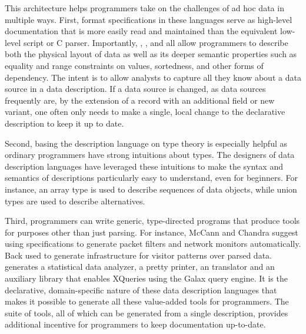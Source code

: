 This architecture helps programmers take on the challenges of ad hoc
data in multiple ways.  First, format specifications in these
languages serve as high-level documentation that is more easily read
and maintained than the equivalent low-level \perl{} script or C
parser.  Importantly, \datascript{}, \packettypes{}, and \pads{} all
allow programmers to describe both the physical layout of data as well
as its deeper semantic properties such as equality and range
constraints on values, sortedness, and other forms of dependency.  The
intent is to allow analysts to capture all they know about a data
source in a data description.  If a data source is changed, as data
sources frequently are, by the extension of a record with an
additional field or new variant, one often only needs to make a single,
local change to the declarative description to keep it up to date.

Second, basing the description language on type theory is especially helpful as
ordinary programmers have strong intuitions about types.  
The designers of data description languages
have leveraged these intuitions to make the syntax and
semantics of descriptions
particularly easy to understand, even for beginners.  For instance,
an array type is used to describe sequences of data objects, while
union types are used to describe alternatives.

Third, programmers can write generic, type-directed programs that
produce tools for purposes other than just parsing.  For instance,
McCann and Chandra suggest using \packettypes{} specifications to
generate packet filters and network monitors automatically.  Back used
\datascript{} to generate infrastructure for visitor patterns over
parsed data. \pads{} generates a statistical data analyzer, a pretty
printer, an \xml{} translator and an auxiliary library that enables
XQueries using the Galax query engine\cite{galax}.  It is the
declarative, domain-specific nature of these data description
languages that makes it possible to generate all these value-added
tools for programmers.  The suite of tools, all of which can be
generated from a single description, provides additional incentive for
programmers to keep documentation up-to-date.


